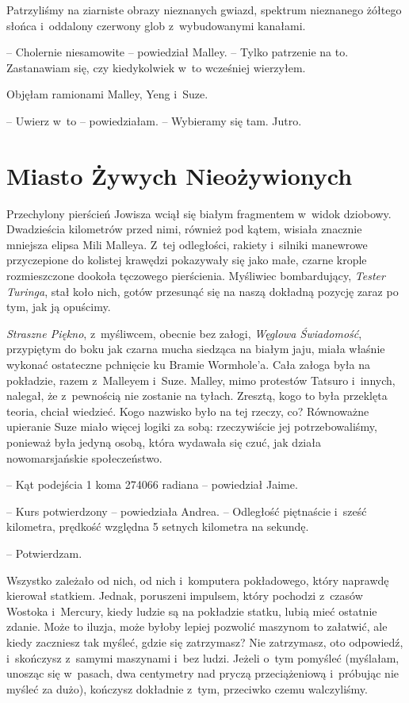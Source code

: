 \documentclass[oneside,polish,11pt,sfheadings]{mwbk}
\begin{document}
Patrzyliśmy na ziarniste obrazy nieznanych gwiazd, spektrum nieznanego
żółtego słońca i~oddalony czerwony glob z~wybudowanymi kanałami.

-- Cholernie niesamowite -- powiedział Malley. -- Tylko patrzenie na to.
Zastanawiam się, czy kiedykolwiek w~to wcześniej wierzyłem.

Objęłam ramionami Malley, Yeng i~Suze. 

-- Uwierz w~to -- powiedziałam. -- Wybieramy się tam. Jutro.


\chapter{Miasto Żywych Nieożywionych}

Przechylony pierścień Jowisza wciął się białym fragmentem w~widok
dziobowy. Dwadzieścia kilometrów przed nimi, również pod kątem, wisiała
znacznie mniejsza elipsa Mili Malleya. Z~tej odległości, rakiety i~silniki manewrowe przyczepione do kolistej krawędzi pokazywały się jako
małe, czarne krople rozmieszczone dookoła tęczowego pierścienia.
Myśliwiec bombardujący, \textit{Tester Turinga}, stał koło nich, gotów
przesunąć się na naszą dokładną pozycję zaraz po tym, jak ją opuścimy.

\textit{Straszne Piękno}, z~myśliwcem, obecnie bez załogi, \textit{Węglowa
Świadomość}, przypiętym do boku jak czarna mucha siedząca na białym jaju,
miała właśnie wykonać ostateczne pchnięcie ku Bramie Wormhole'a. Cała
załoga była na pokładzie, razem z~Malleyem i~Suze. Malley, mimo
protestów Tatsuro i~innych, nalegał, że z~pewnością nie zostanie na
tyłach. Zresztą, kogo to była przeklęta teoria, chciał wiedzieć. Kogo
nazwisko było na tej rzeczy, co? Równoważne upieranie Suze miało więcej
logiki za sobą: rzeczywiście jej potrzebowaliśmy, ponieważ była jedyną
osobą, która wydawała się czuć, jak działa nowomarsjańskie
społeczeństwo.

-- Kąt podejścia 1 koma 274066 radiana -- powiedział Jaime.

-- Kurs potwierdzony -- powiedziała Andrea. -- Odległość piętnaście i~sześć
kilometra, prędkość względna 5 setnych kilometra na sekundę.

-- Potwierdzam.

Wszystko zależało od nich, od nich i~komputera pokładowego, który
naprawdę kierował statkiem. Jednak, poruszeni impulsem, który pochodzi z~czasów Wostoka i~Mercury, kiedy ludzie są na pokładzie statku, lubią
mieć ostatnie zdanie. Może to iluzja, może byłoby lepiej pozwolić
maszynom to załatwić, ale kiedy zaczniesz tak myśleć, gdzie się
zatrzymasz? Nie zatrzymasz, oto odpowiedź, i~skończysz z~samymi
maszynami i~bez ludzi. Jeżeli o~tym pomyśleć (myślałam, unosząc się w~pasach, dwa centymetry nad pryczą przeciążeniową i~próbując nie myśleć
za dużo), kończysz dokładnie z~tym, przeciwko czemu walczyliśmy.
\end{document}
